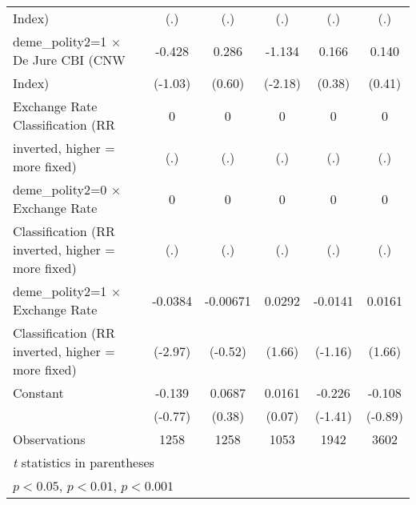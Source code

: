 \begin{table}[htbp]
\begin{tabular}{l*{5}{c}}
Index)                                  &      (.)         &      (.)         &      (.)         &      (.)         &      (.)         \\
\addlinespace
deme\_polity2=1 $\times$ De Jure CBI (CNW&   -0.428         &    0.286         &   -1.134\sym{*}  &    0.166         &    0.140         \\
Index)                                  &  (-1.03)         &   (0.60)         &  (-2.18)         &   (0.38)         &   (0.41)         \\
\addlinespace
Exchange Rate Classification (RR        &        0         &        0         &        0         &        0         &        0         \\
inverted, higher = more fixed)          &      (.)         &      (.)         &      (.)         &      (.)         &      (.)         \\
\addlinespace
deme\_polity2=0 $\times$ Exchange Rate   &        0         &        0         &        0         &        0         &        0         \\
Classification (RR inverted, higher = more fixed)&      (.)         &      (.)         &      (.)         &      (.)         &      (.)         \\
\addlinespace
deme\_polity2=1 $\times$ Exchange Rate   &  -0.0384\sym{**} & -0.00671         &   0.0292         &  -0.0141         &   0.0161         \\
Classification (RR inverted, higher = more fixed)&  (-2.97)         &  (-0.52)         &   (1.66)         &  (-1.16)         &   (1.66)         \\
\addlinespace
Constant                                &   -0.139         &   0.0687         &   0.0161         &   -0.226         &   -0.108         \\
                                        &  (-0.77)         &   (0.38)         &   (0.07)         &  (-1.41)         &  (-0.89)         \\
\midrule
Observations                            &     1258         &     1258         &     1053         &     1942         &     3602         \\
\bottomrule
\multicolumn{6}{l}{\footnotesize \textit{t} statistics in parentheses}\\
\multicolumn{6}{l}{\footnotesize \sym{*} \(p<0.05\), \sym{**} \(p<0.01\), \sym{***} \(p<0.001\)}\\
\end{tabular}
\end{table}

